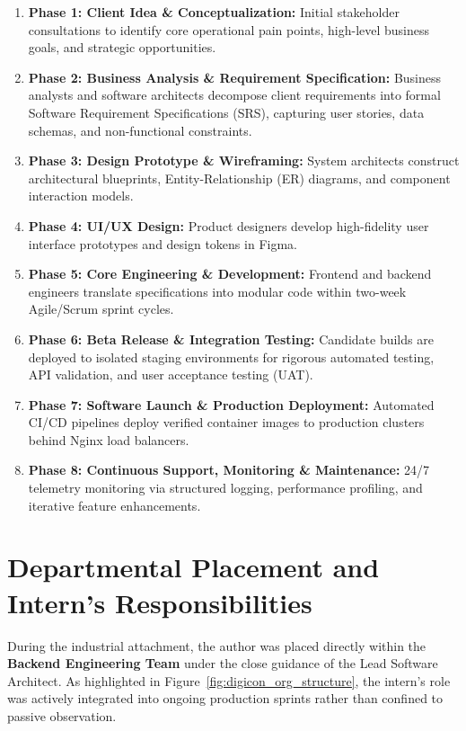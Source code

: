 \begin{enumerate}
    \item \textbf{Phase 1: Client Idea \& Conceptualization:} Initial stakeholder consultations to identify core operational pain points, high-level business goals, and strategic opportunities.
    \item \textbf{Phase 2: Business Analysis \& Requirement Specification:} Business analysts and software architects decompose client requirements into formal Software Requirement Specifications (SRS), capturing user stories, data schemas, and non-functional constraints.
    \item \textbf{Phase 3: Design Prototype \& Wireframing:} System architects construct architectural blueprints, Entity-Relationship (ER) diagrams, and component interaction models.
    \item \textbf{Phase 4: UI/UX Design:} Product designers develop high-fidelity user interface prototypes and design tokens in Figma.
    \item \textbf{Phase 5: Core Engineering \& Development:} Frontend and backend engineers translate specifications into modular code within two-week Agile/Scrum sprint cycles.
    \item \textbf{Phase 6: Beta Release \& Integration Testing:} Candidate builds are deployed to isolated staging environments for rigorous automated testing, API validation, and user acceptance testing (UAT).
    \item \textbf{Phase 7: Software Launch \& Production Deployment:} Automated CI/CD pipelines deploy verified container images to production clusters behind Nginx load balancers.
    \item \textbf{Phase 8: Continuous Support, Monitoring \& Maintenance:} 24/7 telemetry monitoring via structured logging, performance profiling, and iterative feature enhancements.
\end{enumerate}

\section{Departmental Placement and Intern's Responsibilities}
\label{sec:org_intern_placement}

During the industrial attachment, the author was placed directly within the \textbf{Backend Engineering Team} under the close guidance of the Lead Software Architect. As highlighted in Figure~\ref{fig:digicon_org_structure}, the intern's role was actively integrated into ongoing production sprints rather than confined to passive observation.

